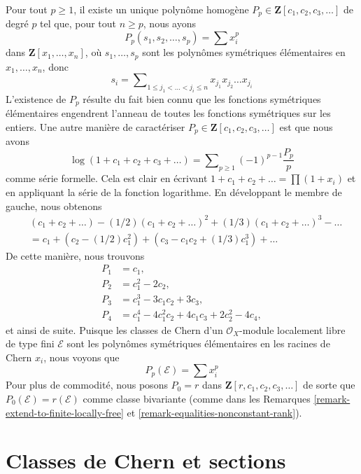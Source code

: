 \begin{example}
\label{example-power-sum}
Pour tout $p \geq 1$, il existe un unique polynôme homogène
$P_p \in \mathbf{Z}[c_1, c_2, c_3, \ldots]$ de degré $p$
tel que, pour tout $n \geq p$, nous ayons
$$
P_p(s_1, s_2, \ldots, s_p) = \sum x_i^p
$$
dans $\mathbf{Z}[x_1, \ldots, x_n]$, où $s_1, \ldots, s_p$ sont les
polynômes symétriques élémentaires en $x_1, \ldots, x_n$, donc
$$
s_i = \sum\nolimits_{1 \leq j_1 < \ldots < j_i \leq n}
x_{j_1}x_{j_2} \ldots x_{j_i}
$$
L'existence de $P_p$ résulte du fait bien connu que
les fonctions symétriques élémentaires engendrent l'anneau de
toutes les fonctions symétriques sur les entiers. Une autre manière de
caractériser $P_p \in \mathbf{Z}[c_1, c_2, c_3, \ldots]$ est que nous avons
$$
\log(1 + c_1 + c_2 + c_3 + \ldots) =
\sum\nolimits_{p \geq 1} (-1)^{p - 1}\frac{P_p}{p}
$$
comme série formelle. Cela est clair en écrivant
$1 + c_1 + c_2 + \ldots = \prod (1 + x_i)$ et en appliquant
la série de la fonction logarithme. En développant le membre de
gauche, nous obtenons
\begin{align*}
& (c_1 + c_2 + \ldots) - (1/2)(c_1 + c_2 + \ldots)^2 +
(1/3)(c_1 + c_2 + \ldots)^3 - \ldots \\
& =
c_1 + (c_2 - (1/2)c_1^2) + (c_3 - c_1c_2 + (1/3)c_1^3) + \ldots
\end{align*}
De cette manière, nous trouvons
\begin{align*}
P_1 & = c_1, \\
P_2 & = c_1^2 - 2c_2, \\
P_3 & = c_1^3 - 3c_1c_2 + 3c_3, \\
P_4 & = c_1^4 - 4c_1^2c_2 + 4c_1c_3 + 2c_2^2 - 4c_4,
\end{align*}
et ainsi de suite. Puisque les classes de Chern d'un
$\mathcal{O}_X$-module localement libre de type fini $\mathcal{E}$ sont les polynômes
symétriques élémentaires en les racines de Chern $x_i$, nous voyons que
$$
P_p(\mathcal{E}) = \sum x_i^p
$$
Pour plus de commodité, nous posons $P_0 = r$ dans $\mathbf{Z}[r, c_1, c_2, c_3, \ldots]$
de sorte que $P_0(\mathcal{E}) = r(\mathcal{E})$ comme classe bivariante
(comme dans les Remarques \ref{remark-extend-to-finite-locally-free} et
\ref{remark-equalities-nonconstant-rank}).
\end{example}






\section{Classes de Chern et sections}
\label{section-top-chern-class}

